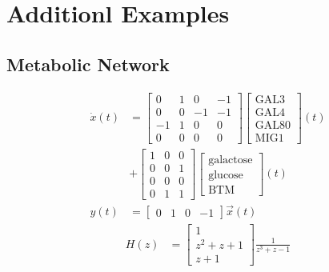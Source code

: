 \documentclass{article}
\newcommand{\1}{\mathbbm{1}}
\begin{document}
  \section*{Additionl Examples}

    \subsection*{Metabolic Network}
  \begin{align*}
    \dot{x}(t) &= \begin{bmatrix} 0 & 1 & 0 & -1 \\ 0 & 0 & -1 & -1 \\ -1 & 1 & 0 & 0 \\ 0 & 0 & 0 & 0 \end{bmatrix} \begin{bmatrix} \text{GAL3} \\ \text{GAL4} \\ \text{GAL80} \\ \text{MIG1} \end{bmatrix}(t) \\ &+ \begin{bmatrix} 1 & 0 & 0 \\ 0 & 0 & 1 \\ 0 & 0 & 0 \\ 0 & 1 & 1 \end{bmatrix} \begin{bmatrix} \text{galactose} \\ \text{glucose} \\ \text{BTM} \end{bmatrix}(t) \\
        y(t) &= \begin{bmatrix} 0 & 1 & 0 & -1 \end{bmatrix} \vec{x}(t)
    \end{align*}
    \begin{align*}
      H(z) &= \begin{bmatrix} 1 \\ z^{2} + z + 1 \\ z + 1 \end{bmatrix} \frac{1}{z^{3} + z -1}
    \end{align*}
\end{document}
